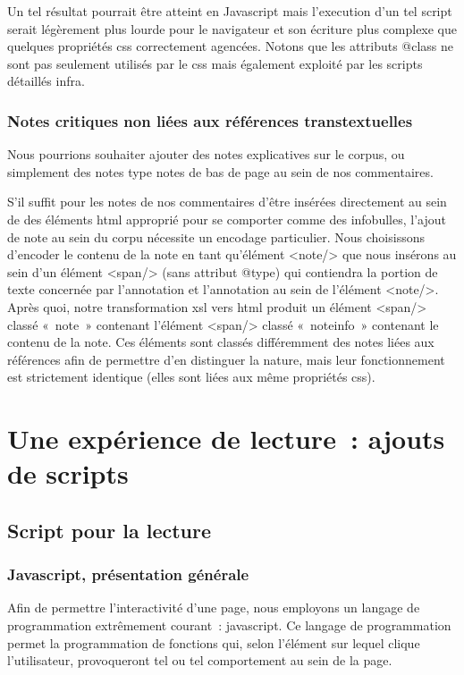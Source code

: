 Un tel résultat pourrait être atteint en Javascript mais l'execution d'un tel script serait légèrement plus lourde pour le navigateur et son écriture plus complexe que quelques propriétés css correctement agencées. Notons que les attributs @class ne sont pas seulement utilisés par le css mais également exploité par les scripts détaillés infra.

\subsubsection{Notes critiques non liées aux références transtextuelles}

Nous pourrions souhaiter ajouter des notes explicatives sur le corpus, ou simplement des notes type notes de bas de page au sein de nos commentaires.

S'il suffit pour les notes de nos commentaires d'être insérées directement au sein de des éléments html approprié pour se comporter comme des infobulles, l'ajout de note au sein du corpu nécessite un encodage particulier. Nous choisissons d'encoder le contenu de la note en tant qu'élément <note/> que nous insérons au sein d'un élément <span/> (sans attribut @type) qui contiendra la portion de texte concernée par l'annotation et l'annotation au sein de l'élément <note/>. Après quoi, notre transformation xsl vers html produit un élément <span/> classé « note » contenant l'élément <span/> classé « noteinfo » contenant le contenu de la note. Ces éléments sont classés différemment des notes liées aux références afin de permettre d'en distinguer la nature, mais leur fonctionnement est strictement identique (elles sont liées aux même propriétés css).





\section{Une expérience de lecture~: ajouts de scripts}
\label{js}
    \subsection{Script pour la lecture}

\subsubsection{Javascript, présentation générale}
Afin de permettre l'interactivité d'une page, nous employons un langage de programmation extrêmement courant~: javascript. Ce langage de programmation permet la programmation de fonctions qui, selon l'élément sur lequel clique l'utilisateur, provoqueront tel ou tel comportement au sein de la page.


